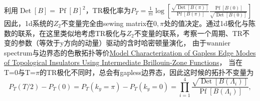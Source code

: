 \documentclass[10pt,openany]{book}
\theoremstyle{thmstyle} %
\theoremstyle{defstyle} %
\theoremstyle{prostyle} %
\begin{document}
利用$\operatorname{Det}[B]=\operatorname{Pf}[B]^2$，TR极化率为$P_T=\frac{1}{\pi i} \log \left[\frac{\sqrt{\operatorname{Det}[B(\pi)]}}{\operatorname{Pf}[B(\pi)]} \frac{\operatorname{Pf}[B(0)]}{\sqrt{\operatorname{Det}[B(0)]}}\right]$\\
因此，1d系统的$Z_2$不变量完全由sewing matrix在$0,\pi$处的值决定。通过1d极化与陈数的联系，在这里类似地考虑TR极化与$Z_2$不变量的联系，考察一个周期、TR不变的参数（等效于y方向的动量）驱动的含时哈密顿量演化，
由于wannier spectrum与边界态的色散拓扑等价\href{https://journals.aps.org/prl/abstract/10.1103/PhysRevLett.107.036601}{Model Characterization of Gapless Edge Modes of Topological Insulators Using Intermediate Brillouin-Zone Functions}，
当在T=0与T=$\pi$的TR极化不同时，总会有gapless边界态，因此这时候的拓扑不变量为
\begin{equation}
  P_T(T / 2)-P_T(0)=P_T\left(k_y=\pi\right)-P_T\left(k_y=0\right)=\prod_{i=1}^4 \frac{\sqrt{\operatorname{Det}\left[B\left(\Lambda_i\right)\right]}}{\operatorname{Pf}\left[B\left(\Lambda_i\right)\right]},
\end{equation}
\end{document}
